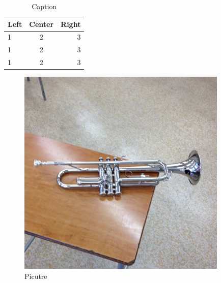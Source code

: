 \documentclass[dvipdfmx,12pt]{ujarticle}
\begin{document}
\begin{table}[ht]
    \caption{Caption}
    \label{SampleTable}
    \centering
    \begin{tabular}{lcr}
        \hline
        Left & Center & Right \\
        \hline \hline
        1 & 2 & 3 \\
        1 & 2 & 3 \\
        1 & 2 & 3 \\
        \hline
    \end{tabular}
\end{table}

\begin{figure}[ht]
    \centering
    \includegraphics[width=10cm]{trp.png}
    \caption{Picutre}
    \label{SampleFigure}
\end{figure}
\end{document}
